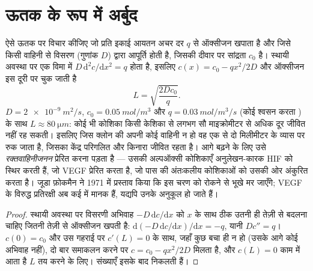 \section{ऊतक के रूप में अर्बुद}

\begin{proposition}[ऑक्सीजन बिना वाहिनी के अर्बुद का आकार तय करती है]\label{prop:b3:cancer-biology:oxygen}
ऐसे ऊतक पर विचार कीजिए जो प्रति इकाई आयतन अचर दर $q$ से ऑक्सीजन खपाता
है और जिसे किसी वाहिनी से विसरण (गुणांक $D$) द्वारा आपूर्ति होती है,
जिसकी दीवार पर सांद्रता $c_{0}$ है। स्थायी अवस्था पर एक विमा में $D\,
\mathrm{d}^{2}c/\mathrm{d}x^{2} = q$ होता है, इसलिए
$c(x) = c_{0} - qx^{2}/2D$ और ऑक्सीजन इस दूरी पर चुक जाती है
\[
L = \sqrt{\frac{2Dc_{0}}{q}} .
\]
$D = \qty{2e-9}{m^2/s}$, $c_{0} = \qty{0.05}{mol/m^3}$ और $q =
\qty{0.03}{mol/m^3/s}$ (कोई श्वसन करता ) के साथ $L \approx \qty{80}{\micro
m}$: कोई भी कोशिका किसी केशिका से लगभग सौ माइक्रोमीटर से अधिक दूर जीवित
नहीं रह सकती। इसलिए जिस क्लोन की अपनी कोई वाहिनी न हो वह एक से दो
मिलीमीटर के व्यास पर रुक जाता है, जिसका केंद्र परिगलित और किनारा
जीवित रहता है। आगे बढ़ने के लिए उसे \emph{रक्तवाहिनीजनन} प्रेरित करना
पड़ता है --- उसकी अल्पऑक्सी कोशिकाएँ अनुलेखन-कारक HIF को स्थिर करती हैं,
जो VEGF प्रेरित करता है, जो पास की अंतःकलीय कोशिकाओं को उसकी ओर अंकुरित
करता है। जूडा फ़ोकमैन ने 1971 में प्रस्ताव किया कि इस चरण को रोकने से
 भूखे मर जाएँगे; VEGF के विरुद्ध प्रतिरक्षी अब कई  में
मानक हैं, यद्यपि  उनके अनुकूल हो जाते हैं।
\end{proposition}
\begin{proof}
स्थायी अवस्था पर विसरणी अभिवाह $-D\,\mathrm{d}c/\mathrm{d}x$ को
$x$ के साथ ठीक उतनी ही तेज़ी से बदलना चाहिए जितनी तेज़ी से ऑक्सीजन
खपती है: $\mathrm{d}(-D\,
\mathrm{d}c/\mathrm{d}x)/\mathrm{d}x = -q$, यानी $D c'' = q$।
$c(0) = c_{0}$ और उस गहराई पर $c'(L) = 0$ के साथ, जहाँ कुछ बचा ही न हो
(उसके आगे कोई अभिवाह नहीं), दो बार समाकलन करने पर $c = c_{0} - qx^{2}/2D$
मिलता है, और $c(L) = 0$ काम में आता है $L$ तय करने के लिए। संख्याएँ
इसके बाद निकलती हैं।
\end{proof}

